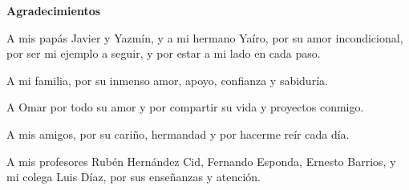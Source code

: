 \begin{center}
{\huge \bfseries Agradecimientos\\}
\end{center}

\vspace{4 mm}

A mis papás Javier y Yazmín, y a mi hermano Yaíro, por su amor incondicional, por ser mi ejemplo a seguir, y por estar a mi lado en cada paso.

\vspace{4 mm}

A mi familia, por su inmenso amor, apoyo, confianza y sabiduría.

\vspace{4 mm}

A Omar por todo su amor y por compartir su vida y proyectos conmigo.

\vspace{4 mm}

A mis amigos, por su cariño, hermandad y por hacerme reír cada día.

\vspace{4 mm}

A mis profesores Rubén Hernández Cid, Fernando Esponda, Ernesto Barrios, y mi colega Luis Díaz, por sus enseñanzas y atención.


\clearpage